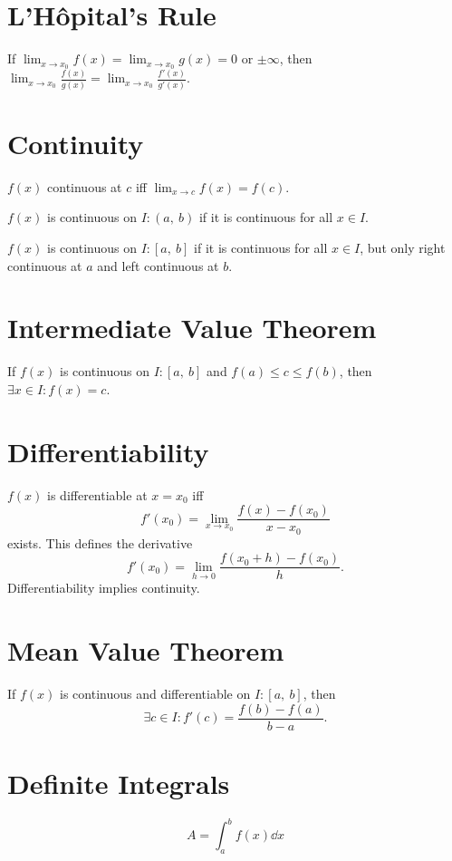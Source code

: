 \documentclass{article}
\begin{document}
\begin{multicols}{3}
    \section*{L'Hôpital's Rule}
    If \(\displaystyle \lim_{x\to x_0}f(x)=\lim_{x\to x_0}g(x)=0\) or \(\pm\infty\), then
    \(\displaystyle \lim_{x\to x_0}\frac{f(x)}{g(x)} = \lim_{x\to x_0}\frac{f'(x)}{g'(x)}\).
    \section*{Continuity}
    \(f(x)\) continuous at \(c\) iff \(\displaystyle \lim_{x\to c} f(x) = f(c)\).

    \(f(x)\) is continuous on \(I:\left( a,\:b \right)\) if it is continuous
    for all \(x\in I\).

    \(f(x)\) is continuous on \(I:\left[ a,\:b \right]\) if it is continuous
    for all \(x\in I\), but only right continuous at \(a\) and left continuous at \(b\).
    \section*{Intermediate Value Theorem}
    If \(f(x)\) is continuous on \(I:\left[ a, \: b \right]\) and \(f(a) \leq c \leq f(b)\), then \(\exists x\in I:f(x)=c\).
    \section*{Differentiability}
    \(f(x)\) is differentiable at \(x=x_0\) iff
    \begin{equation*}
        f'(x_0) = \lim_{x\to x_0} \frac{f(x)-f(x_0)}{x-x_0}
    \end{equation*}
    exists. This defines the derivative
    \begin{equation*}
        f'(x_0) = \lim_{h\to 0} \frac{f(x_0+h)-f(x_0)}{h}.
    \end{equation*}
    Differentiability implies continuity.
    \section*{Mean Value Theorem}
    If \(f(x)\) is continuous and differentiable on \(I:\left[ a,\:b \right]\), then
    \begin{equation*}
        \exists c\in I:f'(c)=\frac{f(b)-f(a)}{b-a}.
    \end{equation*}
    \section*{Definite Integrals}
    \begin{equation*}
        A = \int_a^b f(x) \dd{x}
    \end{equation*}

\end{multicols}
\end{document}
